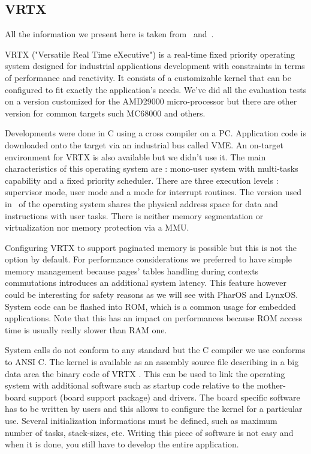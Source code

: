 \documentclass[10pt]{report}
\begin{document}
\subsection{VRTX}

All the information we present here is taken from~\cite{VRTX:90} and~\cite{AMD29000:91}.

VRTX ("Versatile Real Time eXecutive") is a real-time fixed
priority operating system designed for industrial applications
development with constraints in terms of performance and
reactivity. It consists of a customizable kernel that can be
configured to fit exactly the application's needs. We've did all
the evaluation tests on a version customized for the AMD29000
micro-processor but there are other version for common targets
such MC68000 and others.

Developments were done in C using a cross compiler on a PC.
Application code is downloaded onto the target via an industrial
bus called VME. An on-target environment for VRTX is also
available but we didn't use it. The main characteristics of this
operating system are : mono-user system with multi-tasks
capability and a fixed priority scheduler. There are three
execution levels : supervisor mode, user mode and a mode for
interrupt routines. The version used in~\cite{Delchini:95} of the
operating system shares the physical address space for data and
instructions with user tasks. There is neither memory
segmentation or virtualization nor memory protection via a MMU.

Configuring VRTX to support paginated memory is possible but this
is not the option by default. For performance considerations we
preferred to have simple memory management because pages' tables
handling during contexts commutations introduces an additional
system latency. This feature however could be interesting for
safety reasons as we will see with PharOS and LynxOS. System code
can be flashed into ROM, which is a common usage for embedded
applications. Note that this has an impact on performances
because ROM access time is usually really slower than RAM one.

System calls do not conform to any standard but the C compiler we
use conforms to ANSI C. The kernel is available as an assembly
source file describing in a big data area the binary code of VRTX
. This can be used to link the operating system with additional
software such as startup code relative to the mother-board support
(board support package) and drivers. The board specific software
has to be written by users and this allows to configure the kernel
for a particular use. Several initialization informations must be
defined, such as maximum number of tasks, stack-sizes, etc. Writing
this piece of software is not easy and when it is done, you still have to
develop the entire application.
\end{document}
